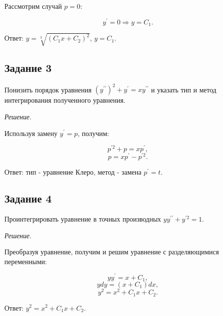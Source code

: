 \documentclass[11pt, a4paper]{article}
\begin{document}
	Рассмотрим случай $p = 0$:
	
	\begin{equation*}
    	y^\prime = 0 \Rightarrow y = C_ 1.
	\end{equation*}
	
	\par\noindent
	Ответ: $y = \sqrt[3]{(C_1x + C_2)^2}$, $y = C_ 1$.
	
	
 	\subsection*{Задание 3}
	\par
	Понизить порядок уравнения $(y^{\prime\prime})^2 + y^\prime = xy^{\prime\prime}$ и указать тип и метод интегрирования полученного уравнения.
	
	\vspace{0.2cm}
	\par
	\textit{Решение}.
	
	\par
	Используя замену $y^{\prime} = p$, получим:
	
	\begin{equation*}
    	p^{\prime 2} + p = xp^\prime,
	\end{equation*}
	\begin{equation*}
    	p = xp^\prime - p^{\prime 2}.
	\end{equation*}
	
	\par\noindent
	Ответ: тип - уравнение Клеро, метод - замена $p^\prime = t$.
	
	
	\subsection*{Задание 4}
	\par
	Проинтегрировать уравнение в точных производных $yy^{\prime\prime} + y^{\prime 2} = 1$.
	
	\vspace{0.2cm}
	\par
	\textit{Решение}.
	
	\par
	Преобразуя уравнение, получим и решим уравнение с разделяющимися переменными:	
	
	\begin{equation*}
    	yy^\prime = x + C_1,
	\end{equation*}
	\begin{equation*}
    	ydy = (x + C_1)dx,
	\end{equation*}
	\begin{equation*}
    	y^2 = x^2 + C_1x + C_2.
	\end{equation*}

	\par\noindent
	Ответ: $y^2 = x^2 + C_1x + C_2$.
\end{document}
